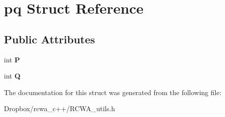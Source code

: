 \hypertarget{structpq}{}\section{pq Struct Reference}
\label{structpq}
\subsection*{Public Attributes}
\begin{DoxyCompactItemize}
\item 
int {\bfseries P}\hypertarget{structpq_aff9113fe60a243ee168b53ae1eba6662}{}\label{structpq_aff9113fe60a243ee168b53ae1eba6662}

\item 
int {\bfseries Q}\hypertarget{structpq_aae11b312b4ae324e9a8166af3340fda3}{}\label{structpq_aae11b312b4ae324e9a8166af3340fda3}

\end{DoxyCompactItemize}


The documentation for this struct was generated from the following file\+:\begin{DoxyCompactItemize}
\item 
Dropbox/rcwa\+\_\+c++/R\+C\+W\+A\+\_\+utils.\+h\end{DoxyCompactItemize}
